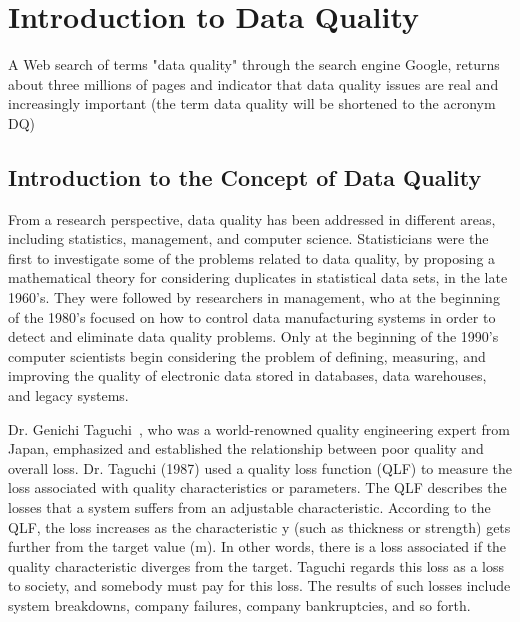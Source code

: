 

\ifpdf
    \graphicspath{{Chapter1/Figs/Raster/}{Chapter1/Figs/PDF/}{Chapter1/Figs/}}
\else
    \graphicspath{{Chapter1/Figs/Vector/}{Chapter1/Figs/}}
\fi

\chapter{Introduction to Data Quality}

A Web search of terms "data quality" through the search engine Google, returns about three millions of pages
and indicator that data quality issues are real and increasingly important (the term data quality will be shortened to the acronym DQ)

\ifpdf
    \graphicspath{{Chapter1/Figs/Raster/}{Chapter1/Figs/PDF/}{Chapter1/Figs/}}
\else
    \graphicspath{{Chapter1/Figs/Vector/}{Chapter1/Figs/}}
\fi

\section{Introduction to the Concept of Data Quality}

From a research perspective, data quality has been addressed in different
areas, including statistics, management, and computer science. Statisticians were the first to investigate some of the problems related to data quality, by
proposing a mathematical theory for considering duplicates in statistical data sets, in the late 1960's. They were followed by researchers in management, who
at the beginning of the 1980's focused on how to control data manufacturing systems in order to detect and eliminate data quality problems. Only at the
beginning of the 1990's computer scientists begin considering the problem of defining, measuring, and improving the quality of electronic data stored in
databases, data warehouses, and legacy systems.~\citep{CBMS}

Dr. Genichi Taguchi~\citep{Jugulum14}, who was a world-renowned quality engineering expert from Japan, emphasized and established the relationship between
poor quality and overall loss. Dr. Taguchi (1987) used a quality loss function (QLF) to measure the loss associated with quality characteristics
or parameters. The QLF describes the losses that a system suffers from an adjustable characteristic. According to the QLF, the loss increases as
the characteristic y (such as thickness or strength) gets further from the target value (m). In other words, there is a loss associated if the quality
characteristic diverges from the target. Taguchi regards this loss as a loss to society, and somebody must pay for this loss. The results of such losses
include system breakdowns, company failures, company bankruptcies, and so forth.

